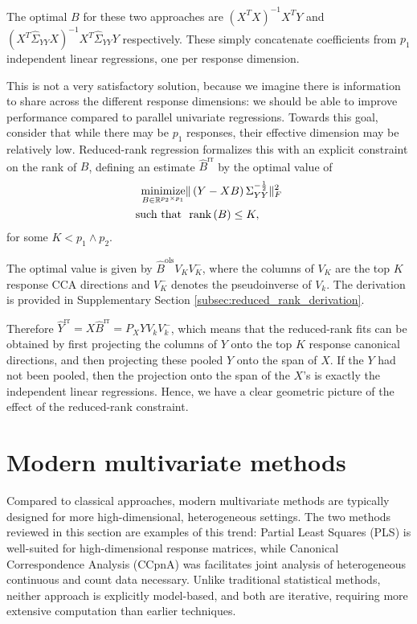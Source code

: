 \documentclass[14pt]{extarticle}
\begin{document}
The optimal $B$ for these two approaches are $\left(X^{T}X\right)^{-1}X^{T}Y$
and $\left(X^{T}\hat{\Sigma}_{YY} X\right)^{-1}X^{T}\hat{\Sigma}_{YY}Y$
respectively. These simply concatenate coefficients from $p_{1}$ independent
linear regressions, one per response dimension.

This is not a very satisfactory solution, because we imagine there is
information to share across the different response dimensions: we should be able
to improve performance compared to parallel univariate regressions. Towards this
goal, consider that while there may be $p_{1}$ responses, their effective
dimension may be relatively low. Reduced-rank regression formalizes this with an
explicit constraint on the rank of $B$, defining an estimate
$\hat{B}^{\text{rr}}$ by the optimal value of
\begin{align}
\mathop\mathrm{minimize}_{B \in \mathbb{R}^{p_{2} \times p_{1}}} &\|\left(Y - XB\right)\Sigma_{YY}^{-\frac{1}{2}}\|_{F}^{2} \label{eq:rr_obj}\\
\text{such that } &\text{ rank}\left(B\right) \leq K, \nonumber
\end{align}
for some $K < p_{1}\wedge p_{2}$.

The optimal value is given by $\hat{B}^{\text{ols}}V_{K}V_{K}^{-}$, where the
columns of $V_{K}$ are the top $K$ response CCA directions and $V_{K}^{-}$
denotes the pseudoinverse of $V_k$. The derivation is provided in Supplementary
Section \ref{subsec:reduced_rank_derivation}.

Therefore $\hat{Y}^{\text{rr}} = X\hat{B}^{\text{rr}} = P_{X}YV_{k}V_{k}^{-}$,
which means that the reduced-rank fits can be obtained by first projecting the
columns of $Y$ onto the top $K$ response canonical directions, and then
projecting these pooled $Y$ onto the span of $X$. If the $Y$ had not been
pooled, then the projection onto the span of the $X$'s is exactly the
independent linear regressions. Hence, we have a clear geometric picture of the
effect of the reduced-rank constraint.

\section{Modern multivariate methods}

Compared to classical approaches, modern multivariate methods are typically
designed for more high-dimensional, heterogeneous settings. The two methods
reviewed in this section are examples of this trend: Partial Least Squares (PLS)
is well-suited for high-dimensional response matrices, while Canonical
Correspondence Analysis (CCpnA) was facilitates joint analysis of heterogeneous
continuous and count data necessary. Unlike traditional statistical methods,
neither approach is explicitly model-based, and both are iterative, requiring
more extensive computation than earlier techniques.
\end{document}
